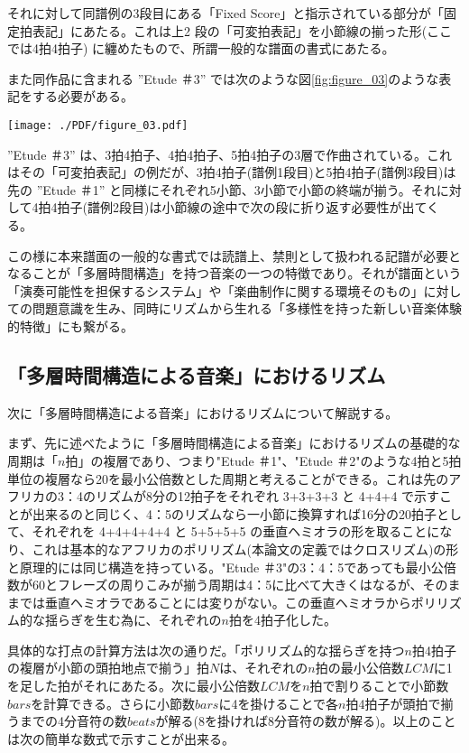 \documentclass[uplatex,dvipdfmx]{ujarticle}
\begin{document}
それに対して同譜例の3段目にある「Fixed Score」と指示されている部分が「固定拍表記」にあたる。これは上2 段の「可変拍表記」を小節線の揃った形(ここでは4拍4拍子) に纏めたもので、所謂一般的な譜面の書式にあたる。

また同作品に含まれる ''Etude ＃3'' では次のような図\ref{fig:figure_03}のような表記をする必要がある。

\begin{figure*}[htb]
\centerline{
	\texttt{[image: ./PDF/figure\_03.pdf]}
}
\caption{Etude ＃3 [A][B]パート}
\label{fig:figure_03}
\end{figure*}

''Etude ＃3'' は、3拍4拍子、4拍4拍子、5拍4拍子の3層で作曲されている。これはその「可変拍表記」の例だが、3拍4拍子(譜例1段目)と5拍4拍子(譜例3段目)は先の ''Etude ＃1'' と同様にそれぞれ5小節、3小節で小節の終端が揃う。それに対して4拍4拍子(譜例2段目)は小節線の途中で次の段に折り返す必要性が出てくる。

この様に本来譜面の一般的な書式では読譜上、禁則として扱われる記譜が必要となることが「多層時間構造」を持つ音楽の一つの特徴であり。それが譜面という「演奏可能性を担保するシステム」や「楽曲制作に関する環境そのもの」に対しての問題意識を生み、同時にリズムから生れる「多様性を持った新しい音楽体験的特徴」にも繋がる。

\subsection{「多層時間構造による音楽」におけるリズム}

次に「多層時間構造による音楽」におけるリズムについて解説する。

まず、先に述べたように「多層時間構造による音楽」におけるリズムの基礎的な周期は「$ n $拍」の複層であり、つまり"Etude ＃1"、"Etude ＃2"のような4拍と5拍単位の複層なら20を最小公倍数とした周期と考えることができる。これは先のアフリカの3：4のリズムが8分の12拍子をそれぞれ 3+3+3+3 と 4+4+4 で示すことが出来るのと同じく、4：5のリズムなら一小節に換算すれば16分の20拍子として、それぞれを 4+4+4+4+4 と 5+5+5+5 の垂直ヘミオラの形を取ることになり、これは基本的なアフリカのポリリズム(本論文の定義ではクロスリズム)の形と原理的には同じ構造を持っている。"Etude ＃3"の3：4：5であっても最小公倍数が60とフレーズの周りこみが揃う周期は4：5に比べて大きくはなるが、そのままでは垂直ヘミオラであることには変りがない。この垂直ヘミオラからポリリズム的な揺らぎを生む為に、それぞれの$ n $拍を4拍子化した。

具体的な打点の計算方法は次の通りだ。「ポリリズム的な揺らぎを持つ$ n $拍4拍子の複層が小節の頭拍地点で揃う」拍$ N $は、それぞれの$ n $拍の最小公倍数$ LCM $に1を足した拍がそれにあたる。次に最小公倍数$ LCM $を$ n $拍で割りることで小節数$ bars $を計算できる。さらに小節数$ bars $に4を掛けることで各$ n $拍4拍子が頭拍で揃うまでの4分音符の数$ beats $が解る(8を掛ければ8分音符の数が解る)。以上のことは次の簡単な数式で示すことが出来る。\\
\end{document}
